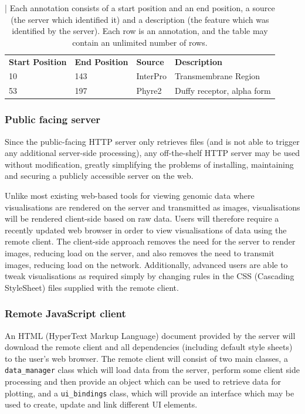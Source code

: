 \documentclass[fleqn,10pt]{article} %
\begin{document}
\begin{table}[h]
\begin{tabular}{llll}
\textbf{Start Position} & \textbf{End Position} & \textbf{Source} & \textbf{Description}       \\
10                      & 143                   & InterPro        & Transmembrane Region       \\
53                      & 197                   & Phyre2          & Duffy receptor, alpha form
\end{tabular}
\caption{ | Each annotation consists of a start position and an end position, a source (the server which identified it) and a description (the feature which was identified by the server). Each row is an annotation, and the table may contain an unlimited number of rows.}
\end{table}

\subsubsection{Public facing server}

Since the public-facing HTTP server only retrieves files (and is not able to trigger any additional server-side processing), any off-the-shelf HTTP server may be used without modification, greatly simplifying the problems of installing, maintaining and securing a publicly accessible server on the web.

Unlike most existing web-based tools for viewing genomic data where visualisations are rendered on the server and transmitted as images, visualisations will be rendered client-side based on raw data. Users will therefore require a recently updated web browser in order to view visualisations of data using the remote client. The client-side approach removes the need for the server to render images, reducing load on the server, and also removes the need to transmit images, reducing load on the network. Additionally, advanced users are able to tweak visualisations as required simply by changing rules in the CSS (Cascading StyleSheet) files supplied with the remote client.

\subsubsection{Remote JavaScript client}

An HTML (HyperText Markup Language) document provided by the server will download the remote client and all dependencies (including default style sheets) to the user's web browser. The remote client will consist of two main classes, a \texttt{data\_manager} class which will load data from the server, perform some client side processing and then provide an object which can be used to retrieve data for plotting, and a \texttt{ui\_bindings} class, which will provide an interface which may be used to create, update and link different UI elements.
\end{document}
